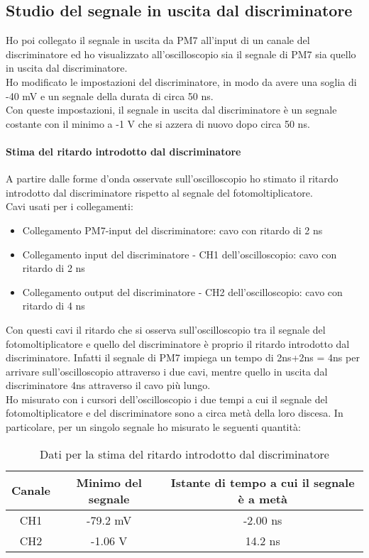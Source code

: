 \documentclass{article}
\begin{document}
\subsection{Studio del segnale in uscita dal discriminatore}
Ho poi collegato il segnale in uscita da PM7 all'input di un canale del discriminatore ed ho visualizzato all'oscilloscopio sia il segnale di PM7 sia quello in uscita dal discriminatore. \\
Ho modificato le impostazioni del discriminatore, in modo da avere una soglia di -40 mV e un segnale della durata di circa 50 ns.\\
Con queste impostazioni, il segnale in uscita dal discriminatore è un segnale costante con il minimo a -1 V che si azzera di nuovo dopo circa 50 ns.
\paragraph{Stima del ritardo introdotto dal discriminatore} A partire dalle forme d'onda osservate sull'oscilloscopio ho stimato il ritardo introdotto dal discriminatore rispetto al segnale del fotomoltiplicatore.\\
Cavi usati per i collegamenti:
\begin{itemize}
    \item Collegamento PM7-input del discriminatore: cavo con ritardo di 2 ns
    \item Collegamento input del discriminatore - CH1 dell'oscilloscopio: cavo con ritardo di 2 ns
     \item Collegamento output del discriminatore - CH2 dell'oscilloscopio: cavo con ritardo di 4 ns
\end{itemize}
Con questi cavi il ritardo che si osserva sull'oscilloscopio tra il segnale del fotomoltiplicatore e quello del discriminatore è proprio il ritardo introdotto dal discriminatore. Infatti il segnale di PM7 impiega un tempo di 2ns+2ns = 4ns per arrivare sull'oscilloscopio attraverso i due cavi, mentre quello in uscita dal discriminatore 4ns attraverso il cavo più lungo.
\\
Ho misurato con i cursori dell'oscilloscopio i due tempi a cui il segnale del fotomoltiplicatore e del discriminatore sono a circa metà della loro discesa. In particolare, per un singolo segnale ho misurato le seguenti quantità: 

\begin{table}[h!]
    \centering
    \begin{tabular}{|c|c|c|}
        \hline
        Canale & Minimo del segnale & Istante di tempo a cui il segnale è a metà\\
        \hline
            CH1 & -79.2 mV & -2.00 ns \\
            CH2 & -1.06 V & 14.2 ns   \\
        \hline
    \end{tabular}
    \caption{Dati per la stima del ritardo introdotto dal discriminatore}
    \label{tab1}
\end{table}
\end{document}

